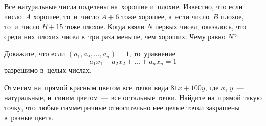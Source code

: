 \begin{problems}
\item
Все натуральные числа поделены на~хорошие и~плохие.
Известно, что если число~$A$ хорошее, то~и~число $A + 6$ тоже хорошее, а~если
число~$B$ плохое, то~и~число $B + 15$ тоже плохое.
Когда взяли $N$ первых чисел, оказалось, что среди них плохих чисел в~три раза
меньше, чем хороших.
Чему равно $N$?

\item
Докажите, что если $(a_1, a_2, \ldots, a_n) = 1$, то~уравнение
\[
    a_{1} x_{1} + a_{2} x_{2} + \ldots + a_{n} x_{n} = 1
\]
разрешимо в~целых числах.

\item
Отметим на~прямой красным цветом все точки вида $81 x + 100y$, где $x$, $y$~---
натуральные, и~синим цветом~--- все остальные точки.
Найдите на~прямой такую точку, что любые симметричные относительно нее целые
точки закрашены в~разные цвета.

\end{problems}

